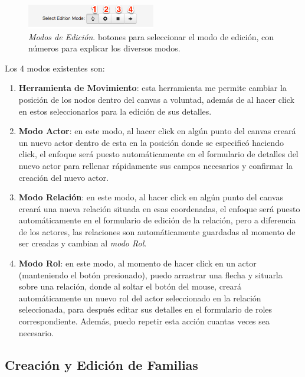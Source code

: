 \begin{figure}[H]
  \centering
  \includegraphics[width=0.5\textwidth]{images/modos_edicion.png}
  \caption[Modos de Edición]{\emph{Modos de Edición}. botones para seleccionar el modo de edición, con números para explicar los diversos modos.}
  \label{modos_edicion}
\end{figure}

Los 4 modos existentes son:

  \begin{enumerate}
    \item \textbf{Herramienta de Movimiento}: esta herramienta me permite cambiar la posición de los nodos dentro del canvas a voluntad, además de al hacer click en estos seleccionarlos para la edición de sus detalles.
    \item \textbf{Modo Actor}: en este modo, al hacer click en algún punto del canvas creará un nuevo actor dentro de esta en la posición donde se especificó haciendo click, el enfoque será puesto automáticamente en el formulario de detalles del nuevo actor para rellenar rápidamente sus campos necesarios y confirmar la creación del nuevo actor.
    \item \textbf{Modo Relación}: en este modo, al hacer click en algún punto del canvas creará una nueva relación situada en esas coordenadas, el enfoque será puesto automáticamente en el formulario de edición de la relación, pero a diferencia de los actores, las relaciones son automáticamente guardadas al momento de ser creadas y cambian al \emph{modo Rol}.
    \item \textbf{Modo Rol}: en este modo, al momento de hacer click en un actor (manteniendo el botón presionado), puedo arrastrar una flecha y situarla sobre una relación, donde al soltar el botón del mouse, creará automáticamente un nuevo rol del actor seleccionado en la relación seleccionada, para después editar sus detalles en el formulario de roles correspondiente. Además, puedo repetir esta acción cuantas veces sea necesario.
  \end{enumerate}



\subsection{Creación y Edición de Familias} %
\label{sub:creacion_y_edicion_de_familias}

